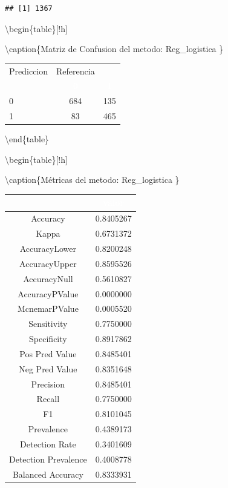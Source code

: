 \documentclass[]{article}
\begin{document}
\begin{lstlisting}
## [1] 1367
\end{lstlisting}

\textbackslash{}begin\{table\}{[}!h{]}

\textbackslash{}caption\{\label{tab:MatrizConf_Reg_logistica}Matriz de
Confusion del metodo: Reg\_logistica \} \centering

\begin{tabular}[t]{lcc}
\toprule
\multicolumn{1}{c}{Prediccion} & \multicolumn{1}{c}{Referencia} & \multicolumn{1}{c}{ } \\
\cmidrule(l{3pt}r{3pt}){1-1} \cmidrule(l{3pt}r{3pt}){2-2}
\rowcolor{black}  \multicolumn{1}{c}{\textcolor{white}{\textbf{ }}} & \multicolumn{1}{c}{\textcolor{white}{\textbf{0}}} & \multicolumn{1}{c}{\textcolor{white}{\textbf{1}}}\\
\midrule
\rowcolor{gray!6}  0 & 684 & 135\\
1 & 83 & 465\\
\bottomrule
\end{tabular}

\textbackslash{}end\{table\}

\textbackslash{}begin\{table\}{[}!h{]}

\textbackslash{}caption\{\label{tab:metricas_Reg_logistica}Métricas del
metodo: Reg\_logistica \} \centering

\begin{tabular}[t]{cc}
\toprule
\rowcolor{black}  \multicolumn{1}{c}{\textcolor{white}{\textbf{metricas}}} & \multicolumn{1}{c}{\textcolor{white}{\textbf{valor}}}\\
\midrule
\rowcolor{gray!6}  Accuracy & 0.8405267\\
Kappa & 0.6731372\\
\rowcolor{gray!6}  AccuracyLower & 0.8200248\\
AccuracyUpper & 0.8595526\\
\rowcolor{gray!6}  AccuracyNull & 0.5610827\\
\addlinespace
AccuracyPValue & 0.0000000\\
\rowcolor{gray!6}  McnemarPValue & 0.0005520\\
Sensitivity & 0.7750000\\
\rowcolor{gray!6}  Specificity & 0.8917862\\
Pos Pred Value & 0.8485401\\
\addlinespace
\rowcolor{gray!6}  Neg Pred Value & 0.8351648\\
Precision & 0.8485401\\
\rowcolor{gray!6}  Recall & 0.7750000\\
F1 & 0.8101045\\
\rowcolor{gray!6}  Prevalence & 0.4389173\\
\addlinespace
Detection Rate & 0.3401609\\
\rowcolor{gray!6}  Detection Prevalence & 0.4008778\\
Balanced Accuracy & 0.8333931\\
\bottomrule
\end{tabular}
\end{document}
